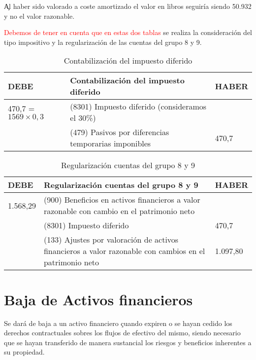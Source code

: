 \c{Al haber sido valorado a coste amortizado el valor en libros seguiría siendo 50.932 y no el valor razonable.}

\textcolor{red}{Debemos de tener en cuenta que en estas dos tablas} se realiza la consideración del tipo impositivo y la regularización de las cuentas del grupo 8 y 9.

\begin{table}[H]
    \centering
    \begin{tabular}{|p{3cm}|p{6cm}|p{3cm}|}
    \hline
    \rowcolor{blue!30}
    \textbf{DEBE} & \textbf{Contabilización del impuesto diferido} & \textbf{HABER} \\
    \hline
    470,7 = \(1569 \times 0,3\) & (8301) Impuesto diferido (consideramos el 30\%) & \\
    \hline
    & (479) Pasivos por diferencias temporarias imponibles & 470,7 \\
    \hline
    \end{tabular}
    \caption{Contabilización del impuesto diferido}
    \label{tabla:impuesto_diferido}
\end{table}

\begin{table}[H]
    \centering
    \begin{tabular}{|p{3cm}|p{6cm}|p{3cm}|}
    \hline
    \rowcolor{blue!30}
    \textbf{DEBE} & \textbf{Regularización cuentas del grupo 8 y 9} & \textbf{HABER} \\
    \hline
    1.568,29 & (900) Beneficios en activos financieros a valor razonable con cambio en el patrimonio neto & \\
    \hline
    & (8301) Impuesto diferido &470,7  \\
    \hline
    & (133) Ajustes por valoración de activos financieros a valor razonable con cambios en el patrimonio neto & 1.097,80 \\
    \hline
    \end{tabular}
    \caption{Regularización cuentas del grupo 8 y 9}
    \label{tabla:regularizacion_grupo_8_9}
\end{table}

\newpage
\section{Baja de Activos financieros}

Se dará de baja a un activo financiero \c{cuando expiren o se hayan cedido los derechos contractuales sobres los flujos de efectivo del mismo}, siendo necesario que se hayan transferido de manera sustancial los riesgos y beneficios inherentes a su propiedad. 

